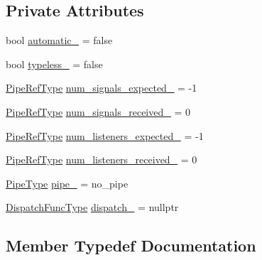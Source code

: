 \subsection*{Private Attributes}
\begin{DoxyCompactItemize}
\item 
bool \hyperlink{structvt_1_1pipe_1_1_pipe_state_afc74c762209659919822abb37dda8b89}{automatic\+\_\+} = false
\item 
bool \hyperlink{structvt_1_1pipe_1_1_pipe_state_af73f5f3e239e4db909b1cde2aa7de3f3}{typeless\+\_\+} = false
\item 
\hyperlink{namespacevt_ace18d74dd489d9ea506d38789fffce34}{Pipe\+Ref\+Type} \hyperlink{structvt_1_1pipe_1_1_pipe_state_a8f072bad48c155b0c8b43ca2f709cac5}{num\+\_\+signals\+\_\+expected\+\_\+} = -\/1
\item 
\hyperlink{namespacevt_ace18d74dd489d9ea506d38789fffce34}{Pipe\+Ref\+Type} \hyperlink{structvt_1_1pipe_1_1_pipe_state_ac5a387ab62c0961fe8ffa32e0e56c439}{num\+\_\+signals\+\_\+received\+\_\+} = 0
\item 
\hyperlink{namespacevt_ace18d74dd489d9ea506d38789fffce34}{Pipe\+Ref\+Type} \hyperlink{structvt_1_1pipe_1_1_pipe_state_a258aa24dd89b3b90e4f4045ec0d52cda}{num\+\_\+listeners\+\_\+expected\+\_\+} = -\/1
\item 
\hyperlink{namespacevt_ace18d74dd489d9ea506d38789fffce34}{Pipe\+Ref\+Type} \hyperlink{structvt_1_1pipe_1_1_pipe_state_ae46d41d7d03a6503e5b647cb9a424bcf}{num\+\_\+listeners\+\_\+received\+\_\+} = 0
\item 
\hyperlink{namespacevt_ac9852acda74d1896f48f406cd72c7bd3}{Pipe\+Type} \hyperlink{structvt_1_1pipe_1_1_pipe_state_a7444cbbce857d44145abb9e44eda23ea}{pipe\+\_\+} = no\+\_\+pipe
\item 
\hyperlink{structvt_1_1pipe_1_1_pipe_state_aa6d3f6b8d9c1a4d1f261bc563ff99e3e}{Dispatch\+Func\+Type} \hyperlink{structvt_1_1pipe_1_1_pipe_state_aca06c747d1462b15cf61431ea7d35330}{dispatch\+\_\+} = nullptr
\end{DoxyCompactItemize}


\subsection{Member Typedef Documentation}
\mbox{\label{structvt_1_1pipe_1_1_pipe_state_aa6d3f6b8d9c1a4d1f261bc563ff99e3e}} 
